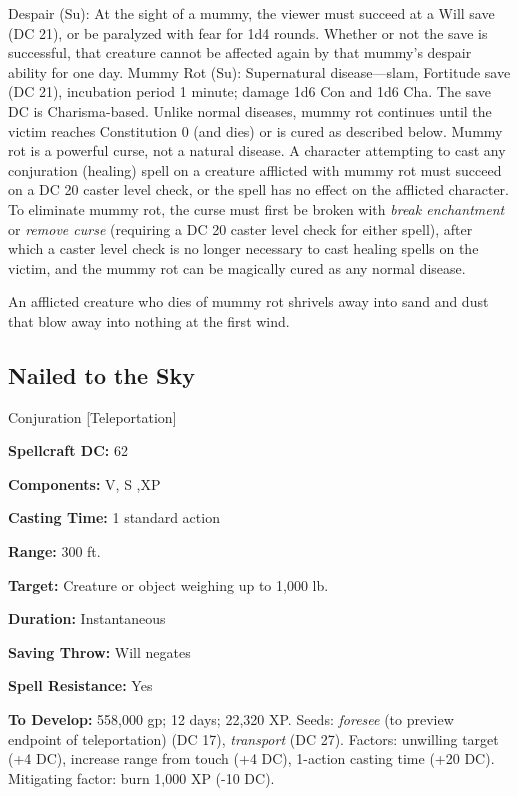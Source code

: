\documentclass{article}
\begin{document}
Despair (Su): At the sight of a mummy, the viewer must succeed at a Will save (DC 
21), or be paralyzed with fear for 1d4 rounds. Whether or not the save is successful, 
that creature cannot be affected again by that mummy's despair ability for one 
day. Mummy Rot (Su): Supernatural disease---slam, Fortitude save (DC 21), incubation 
period 1 minute; damage 1d6 Con and 1d6 Cha. The save DC is Charisma-based. Unlike 
normal diseases, mummy rot continues until the victim reaches Constitution 0 (and 
dies) or is cured as described below.  Mummy rot is a powerful curse, not a natural 
disease. A character attempting to cast any conjuration (healing) spell on a creature 
afflicted with mummy rot must succeed on a DC 20 caster level check, or the spell 
has no effect on the afflicted character. To eliminate mummy rot, the curse must 
first be broken with \textit{break enchantment }or \textit{remove curse }(requiring 
a DC 20 caster level check for either spell), after which a caster level check 
is no longer necessary to cast healing spells on the victim, and the mummy rot 
can be magically cured as any normal disease.

An afflicted creature who dies of mummy rot shrivels away into sand and dust that 
blow away into nothing at the first wind.

\vspace{12pt}
\subsection*{Nailed to the Sky }

Conjuration [Teleportation] 

\textbf{Spellcraft DC:} 62 

\textbf{Components:} V, S ,XP 

\textbf{Casting Time:} 1 standard action 

\textbf{Range:} 300 ft. 

\textbf{Target:} Creature or object weighing up to 1,000 lb. 

\textbf{Duration:} Instantaneous 

\textbf{Saving Throw:} Will negates 

\textbf{Spell Resistance:} Yes 

\textbf{To Develop:} 558,000 gp; 12 days; 22,320 XP. Seeds: \textit{foresee }(to 
preview endpoint of teleportation) (DC 17), \textit{transport }(DC 27). Factors: 
unwilling target (+4 DC), increase range from touch (+4 DC), 1-action casting time 
(+20 DC). Mitigating factor: burn 1,000 XP (-10 DC). 
\end{document}
